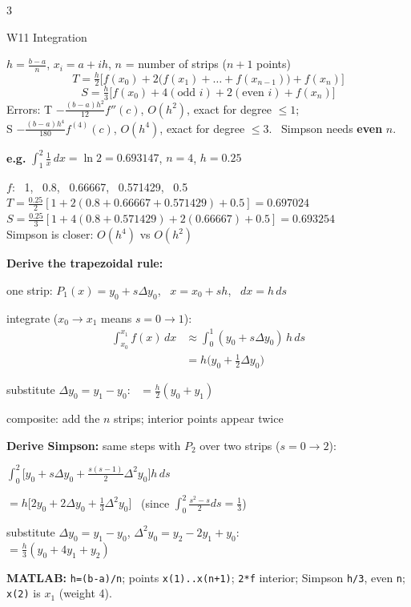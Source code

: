 \documentclass[8pt,a4paper]{extarticle}
\newcommand{\hd}[1]{\par\vspace{3pt}\noindent\colorbox{accent}{\parbox{\dimexpr\linewidth-2\fboxsep}{\color{white}\bfseries\strut #1}}\par\vspace{1pt}}
\newcommand{\sub}[1]{\textbf{\color{accent}#1}}
\newenvironment{ex}[1]{\par\vspace{2pt}\noindent\begin{lrbox}{\exbox}\begin{minipage}{\dimexpr\linewidth-2\fboxsep}\RaggedRight\color{grn}\textbf{e.g.} #1\par\setlength{\parskip}{1.5pt}}{\end{minipage}\end{lrbox}\colorbox{exbg}{\usebox{\exbox}}\par\vspace{1pt}}
\begin{document}
\begin{multicols*}{3}
\hd{W11 Integration}
$h=\frac{b-a}{n}$, $x_i=a+ih$, $n$ = number of strips ($n+1$ points)
\[T=\tfrac h2\big[f(x_0)+2\big(f(x_1)+\dots+f(x_{n-1})\big)+f(x_n)\big]\]
\[S=\tfrac h3\big[f(x_0)+4(\text{odd }i)+2(\text{even }i)+f(x_n)\big]\]
Errors: T $-\frac{(b-a)h^2}{12}f''(c)$, $O(h^2)$, exact for degree $\le1$;\\ S $-\frac{(b-a)h^4}{180}f^{(4)}(c)$, $O(h^4)$, exact for degree $\le3$. \ Simpson needs \textbf{even} $n$.
\begin{ex}{$\int_1^2\frac1x\,dx=\ln2=0.693147$, $n=4$, $h=0.25$}
$f$: \ 1, \ 0.8, \ 0.66667, \ 0.571429, \ 0.5\\
$T=\frac{0.25}{2}[1+2(0.8+0.66667+0.571429)+0.5]=0.697024$\\
$S=\frac{0.25}{3}[1+4(0.8+0.571429)+2(0.66667)+0.5]=0.693254$\\
Simpson is closer: $O(h^4)$ vs $O(h^2)$
\end{ex}
\sub{Derive the trapezoidal rule:}
\begin{der}
\item one strip: $P_1(x)=y_0+s\Delta y_0$, \ $x=x_0+sh$, \ $dx=h\,ds$
\item integrate ($x_0\to x_1$ means $s=0\to1$):
\begin{align*}\int_{x_0}^{x_1}f(x)\,dx&\approx\int_0^1(y_0+s\Delta y_0)\,h\,ds\\&=h\big(y_0+\tfrac12\Delta y_0\big)\end{align*}
\item substitute $\Delta y_0=y_1-y_0$: \ $=\frac h2(y_0+y_1)$
\item composite: add the $n$ strips; interior points appear twice
\end{der}
\sub{Derive Simpson:} same steps with $P_2$ over two strips ($s=0\to2$):
\begin{der}
\item $\displaystyle\int_0^2\Big[y_0+s\Delta y_0+\frac{s(s-1)}2\Delta^2y_0\Big]h\,ds$
\item $=h\big[2y_0+2\Delta y_0+\frac13\Delta^2y_0\big]$ \ (since $\int_0^2\frac{s^2-s}{2}ds=\frac13$)
\item substitute $\Delta y_0=y_1-y_0$, $\Delta^2y_0=y_2-2y_1+y_0$:\\ $=\frac h3(y_0+4y_1+y_2)$
\end{der}
\sub{MATLAB:} \texttt{h=(b-a)/n}; points \texttt{x(1)..x(n+1)}; \texttt{2*f} interior; Simpson \texttt{h/3}, even \texttt{n}; \texttt{x(2)} is $x_1$ (weight 4).


\end{multicols*}
\end{document}
